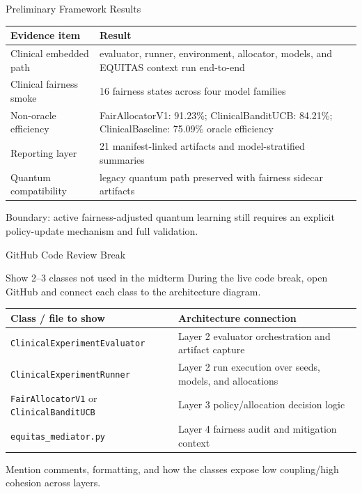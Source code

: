 \documentclass[aspectratio=169,10pt]{beamer}
\begin{document}
\begin{frame}{Preliminary Framework Results}
\begin{center}
\begin{tabular}{p{}p{}}
\toprule
Evidence item & Result \\
\midrule
Clinical embedded path & evaluator, runner, environment, allocator, models, and EQUITAS context run end-to-end \\
Clinical fairness smoke & 16 fairness states across four model families \\
Non-oracle efficiency & FairAllocatorV1: 91.23\%; ClinicalBanditUCB: 84.21\%; ClinicalBaseline: 75.09\% oracle efficiency \\
Reporting layer & 21 manifest-linked artifacts and model-stratified summaries \\
Quantum compatibility & legacy quantum path preserved with fairness sidecar artifacts \\
\bottomrule
\end{tabular}
\end{center}
\vspace{0.3em}
\small Boundary: active fairness-adjusted quantum learning still requires an explicit policy-update mechanism and full validation.
\end{frame}

\begin{frame}{GitHub Code Review Break}
\begin{block}{Show 2--3 classes not used in the midterm}
During the live code break, open GitHub and connect each class to the architecture diagram.
\end{block}

\begin{center}
\small
\begin{tabular}{p{}p{}}
\toprule
Class / file to show & Architecture connection \\
\midrule
\texttt{ClinicalExperimentEvaluator} & Layer 2 evaluator orchestration and artifact capture \\
\texttt{ClinicalExperimentRunner} & Layer 2 run execution over seeds, models, and allocations \\
\texttt{FairAllocatorV1} or \texttt{ClinicalBanditUCB} & Layer 3 policy/allocation decision logic \\
\texttt{equitas\_mediator.py} & Layer 4 fairness audit and mitigation context \\
\bottomrule
\end{tabular}
\end{center}

\vspace{0.4em}
\small Mention comments, formatting, and how the classes expose low coupling/high cohesion across layers.
\end{frame}
\end{document}
